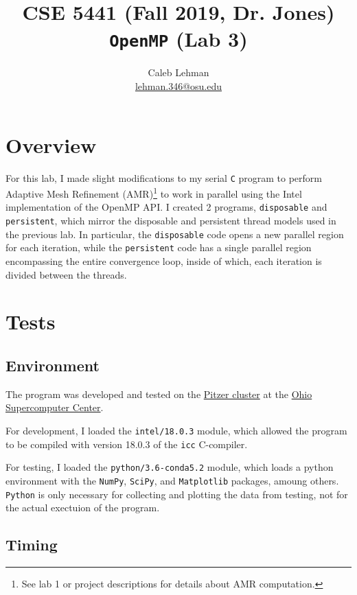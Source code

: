 \documentclass{article}
\title{
CSE 5441 (Fall 2019, Dr. Jones)\\
\large \texttt{OpenMP} (Lab 3)
}
\author{
Caleb Lehman \\
\href{mailto:lehman.346@osu.edu}{lehman.346@osu.edu}
}
\begin{document}
\maketitle

\section*{Overview}
\label{sec:overview}

For this lab, I made slight modifications to my serial \texttt{C} program to
perform Adaptive Mesh Refinement (AMR)\footnote{See lab 1 or project
descriptions for details about AMR computation.} to work in parallel using the
Intel implementation of the OpenMP API.  I created 2 programs,
\texttt{disposable} and \texttt{persistent}, which mirror the disposable and
persistent thread models used in the previous lab. In particular, the
\texttt{disposable} code opens a new parallel region for each iteration, while
the \texttt{persistent} code has a single parallel region encompassing the
entire convergence loop, inside of which, each iteration is divided between the
threads.

\section*{Tests}
\label{sec:tests}

\subsection*{Environment}
\label{subsec:environment}

The program was developed and tested on the
\href{https://www.osc.edu/resources/technical_support/supercomputers/pitzer}{Pitzer
cluster} at the \href{https://www.osc.edu/}{Ohio Supercomputer Center}.

For development, I loaded the \texttt{intel/18.0.3} module, which allowed the
program to be compiled with version 18.0.3 of the \texttt{icc} C-compiler.

For testing, I loaded the \texttt{python/3.6-conda5.2} module, which loads a
python environment with the \texttt{NumPy}, \texttt{SciPy}, and
\texttt{Matplotlib} packages, amoung others. \texttt{Python} is only necessary
for collecting and plotting the data from testing, not for the actual exectuion
of the program.

\subsection*{Timing}
\label{subsec:timing}
\end{document}
